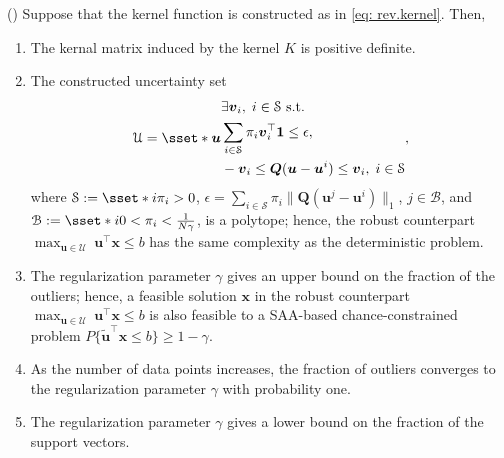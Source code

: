 \documentclass[final,onefignum,onetabnum]{class}
\newcommand{\bs}[1]{\boldsymbol{#1}} %
\newcommand{\Cs}[1]{\mathcal{#1}} %
\newcommand{\tbs}[1]{\tilde{\bs{#1}}}
\newcommand{\st}{\text{s.t.}}
\begin{document}
\begin{theorem}{(\citet[Propositions~1, Propositions~3--4]{shang2017})}
    \label{thm: shang_SVC}
    Suppose that the kernel function is constructed as in \eqref{eq: rev.kernel}. Then,
    \begin{enumerate}[label=(\roman*)]
        \item The kernal matrix induced by the kernel $K$ is positive definite. %
        \item The constructed  uncertainty set 
        \begin{equation*}
        	\Cs{U}=\sset*{\bs{u}}{ 
        		\begin{aligned}  
        			& \exists \bs{v}_{i}, \; i \in \Cs{S} \ \st \\
        			& \sum_{i \in \Cs{S}} \pi_{i} \bs{v}_{i}^{\top} \bs{1} \le \epsilon, \\
        			& -\bs{v}_{i} \le \bs{Q}(\bs{u}-\bs{u}^{i}) \le \bs{v}_{i}, \; i \in \Cs{S}
        		\end{aligned}  
        	},
    \end{equation*} 
        where $\Cs{S}:=\sset*{i}{\pi_{i} > 0}$,  $\epsilon=\sum_{i \in \Cs{S}} \pi_{i} \|\bs{Q}(\bs{u}^{j}-\bs{u}^{i})\|_{1}$, $j \in \Cs{B}$, and  $\Cs{B}:=\sset*{i}{0 < \pi_{i} < \frac{1}{N\gamma}}$, 
        is a polytope; hence, the robust counterpart \linebreak $\max_{\bs{u} \in \Cs{U}} \ \bs{u}^{\top} \bs{x} \le b$ has the same complexity as  the deterministic problem. 
        \item The regularization parameter $\gamma$ gives an upper bound on the fraction of the outliers; hence, a feasible solution $\bs{x}$ in the robust counterpart $\max_{\bs{u} \in \Cs{U}} \ \bs{u}^{\top} \bs{x} \le b$ is also feasible to a SAA-based chance-constrained problem $P\{\tbs{u}^{\top} \bs{x} \le b\} \ge 1-\gamma$.
        \item As the number of data points increases, the fraction of outliers converges to the regularization parameter $\gamma$ with probability one. 
        \item The regularization parameter $\gamma$ gives a lower  bound on the fraction of the support vectors. 
    \end{enumerate}
\end{theorem}
\end{document}
